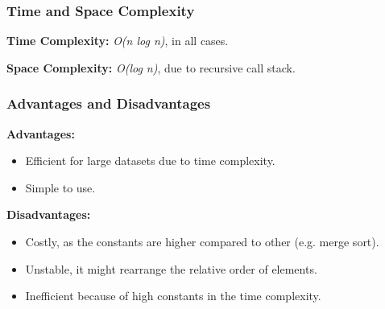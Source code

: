 \subsubsection*{Time and Space Complexity}

\textbf{Time Complexity:} \textit{O(n log n)}, in all cases.

\textbf{Space Complexity:} \textit{O(log n)}, due to recursive call stack.

\subsubsection*{Advantages and Disadvantages}

\textbf{Advantages:}

\begin{itemize}
  \item Efficient for large datasets due to time complexity.
  \item Simple to use.
\end{itemize}

\textbf{Disadvantages:}

\begin{itemize}
  \item Costly, as the constants are higher compared to other (e.g. merge sort).
  \item Unstable, it might rearrange the relative order of elements.
  \item Inefficient because of high constants in the time complexity.
\end{itemize}

